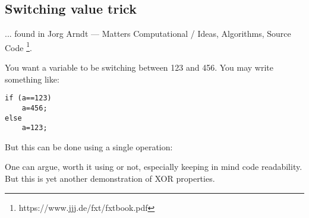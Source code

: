 \subsection{Switching value trick}

... found in Jorg Arndt --- Matters Computational / Ideas, Algorithms, Source Code
\footnote{https://www.jjj.de/fxt/fxtbook.pdf}.

You want a variable to be switching between 123 and 456.
You may write something like:

\begin{lstlisting}
if (a==123)
    a=456;
else
    a=123;
\end{lstlisting}

But this can be done using a single operation:



One can argue, worth it using or not, especially keeping in mind code readability.
But this is yet another demonstration of XOR properties.


